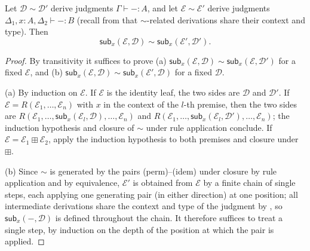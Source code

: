 \begin{lemma}
\label{lemma:subst_respects_perm}
Let $\mathcal{D} \sim \mathcal{D}'$ derive judgments $\Gamma \vdash - : A$, and let $\mathcal{E} \sim \mathcal{E}'$ derive judgments $\Delta_1, x : A, \Delta_2 \vdash - : B$ (recall from  that $\sim$-related derivations share their context and type).  Then
\[
\mathsf{sub}_x(\mathcal{E}, \mathcal{D}) \sim \mathsf{sub}_x(\mathcal{E}', \mathcal{D}').
\]
\end{lemma}
\begin{proof}
By transitivity it suffices to prove
(a) $\mathsf{sub}_x(\mathcal{E}, \mathcal{D}) \sim \mathsf{sub}_x(\mathcal{E}, \mathcal{D}')$ for a fixed $\mathcal{E}$, and
(b) $\mathsf{sub}_x(\mathcal{E}, \mathcal{D}) \sim \mathsf{sub}_x(\mathcal{E}', \mathcal{D})$ for a fixed $\mathcal{D}$.

(a) By induction on $\mathcal{E}$.
If $\mathcal{E}$ is the identity leaf, the two sides are $\mathcal{D}$ and $\mathcal{D}'$.
If $\mathcal{E} = R(\mathcal{E}_1, \ldots, \mathcal{E}_n)$ with $x$ in the context of the $l$-th premise, then the two sides are $R(\mathcal{E}_1, \ldots, \mathsf{sub}_x(\mathcal{E}_l, \mathcal{D}), \ldots, \mathcal{E}_n)$ and $R(\mathcal{E}_1, \ldots, \mathsf{sub}_x(\mathcal{E}_l, \mathcal{D}'), \ldots, \mathcal{E}_n)$; the induction hypothesis and closure of $\sim$ under rule application conclude.
If $\mathcal{E} = \mathcal{E}_1 \boxplus \mathcal{E}_2$, apply the induction hypothesis to both premises and closure under $\boxplus$.

(b) Since $\sim$ is generated by the pairs (perm)--(idem) under closure by rule application and by equivalence, $\mathcal{E}'$ is obtained from $\mathcal{E}$ by a finite chain of single steps, each applying one generating pair (in either direction) at one position; all intermediate derivations share the context and type of the judgment by , so $\mathsf{sub}_x(-, \mathcal{D})$ is defined throughout the chain.
It therefore suffices to treat a single step, by induction on the depth of the position at which the pair is applied.


\end{proof}
